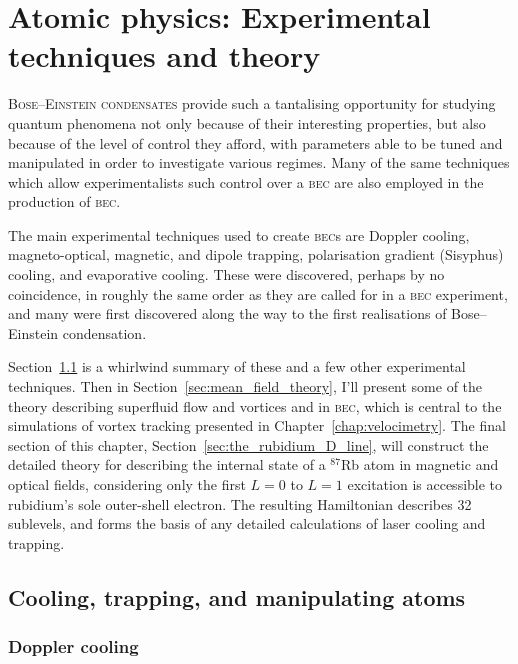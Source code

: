 \chapter{Atomic physics: Experimental techniques and theory}\label{chap:atomic_physics}

\lettrine[lines=3]{B}{ose--Einstein condensates} provide such a tantalising opportunity for studying quantum phenomena not only because of their interesting properties, but also because of the level of control they afford, with parameters able to be tuned and manipulated in order to investigate various regimes. Many of the same techniques which allow experimentalists such control over a \textsc{bec} are also employed in the production of \textsc{bec}.

The main experimental techniques used to create \textsc{bec}s are Doppler cooling, magneto-optical, magnetic, and dipole trapping, polarisation gradient (Sisyphus) cooling, and evaporative cooling. These were discovered, perhaps by no coincidence, in roughly the same order as they are called for in a \textsc{bec} experiment, and many were first discovered along the way to the first realisations of Bose--Einstein condensation.

Section~\ref{sec:cooling_and_trapping} is a whirlwind summary of these and a few other experimental techniques. Then in Section~\ref{sec:mean_field_theory}, I'll present some of the theory describing superfluid flow and vortices and in \textsc{bec}, which is central to the simulations of vortex tracking presented in Chapter~\ref{chap:velocimetry}. The final section of this chapter, Section~\ref{sec:the_rubidium_D_line}, will construct the detailed theory for describing the internal state of a $^{87}$Rb atom in magnetic and optical fields, considering only the first $L=0$ to $L=1$ excitation is accessible to rubidium's  sole outer-shell electron. The resulting Hamiltonian describes 32 sublevels, and forms the basis of any detailed calculations of laser cooling and trapping.

\section{Cooling, trapping, and manipulating atoms}\label{sec:cooling_and_trapping}

\subsection{Doppler cooling}\label{sec:doppler_cooling}

